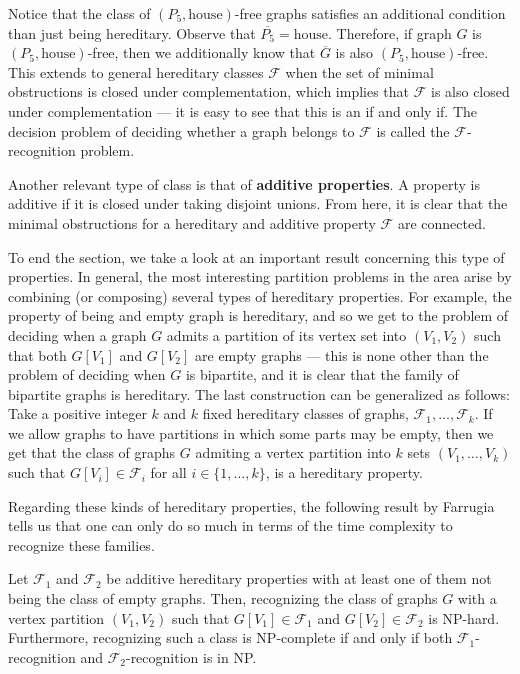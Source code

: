 Notice that the class of $(P_5,\text{house})$-free graphs satisfies an
additional condition than just being hereditary. Observe that
$\overline{P_5}=\text{house}$. Therefore, if graph $G$ is
$(P_5,\text{house})$-free, then we additionally know that $\overline{G}$ is also
$(P_5,\text{house})$-free. This extends to general hereditary classes
$\mathcal{F}$ when the set of minimal obstructions is closed under
complementation, which implies that $\mathcal{F}$ is also closed under
complementation --- it is easy to see that this is an if and only if. The
decision problem of deciding whether a graph belongs to $\mathcal{F}$ is called
the $\mathcal{F}$-recognition problem.

Another relevant type of class is that of \textbf{additive
properties}. A property is additive if it is closed
under taking disjoint unions. From here, it is clear that the minimal
obstructions for a hereditary and additive property $\mathcal{F}$ are connected.

To end the section, we take a look at an important result concerning this type
of properties. In general, the most interesting partition problems in the area
arise by combining (or composing) several types of hereditary properties. For
example, the property of being and empty graph is hereditary, and so we get to
the problem of deciding when a graph $G$ admits a partition of its vertex set
into $(V_1,V_2)$ such that both $G[V_1]$ and $G[V_2]$ are empty graphs --- this
is none other than the problem of deciding when $G$ is bipartite, and it is
clear that the family of bipartite graphs is hereditary. The last construction
can be generalized as follows: Take a positive integer $k$ and $k$ fixed
hereditary classes of graphs, $\mathcal{F}_1, \dots, \mathcal{F}_k$. If we allow
graphs to have partitions in which some parts may be empty, then we get that the
class of graphs $G$ admiting a vertex partition into $k$ sets $(V_1,\dots,V_k)$
such that $G[V_i]\in \mathcal{F}_i$ for all $i \in \{1, \dots, k\}$, is a
hereditary property.

Regarding these kinds of hereditary properties, the following result by Farrugia
\cite{farrugia2004} tells us that one can only do so much in terms of the time
complexity to recognize these families.

\begin{theorem}
\label{thm:farrugia}
    Let $\mathcal{F}_1$ and $\mathcal{F}_2$ be additive hereditary properties
    with at least one of them not being the class of empty graphs. Then,
    recognizing the class of graphs $G$ with a vertex partition $(V_1,V_2)$ such
    that $G[V_1]\in \mathcal{F}_1$ and $G[V_2]\in \mathcal{F}_2$ is NP-hard.
    Furthermore, recognizing such a class is NP-complete if and only if both
    $\mathcal{F}_1$-recognition and $\mathcal{F}_2$-recognition is in NP.
\end{theorem}

